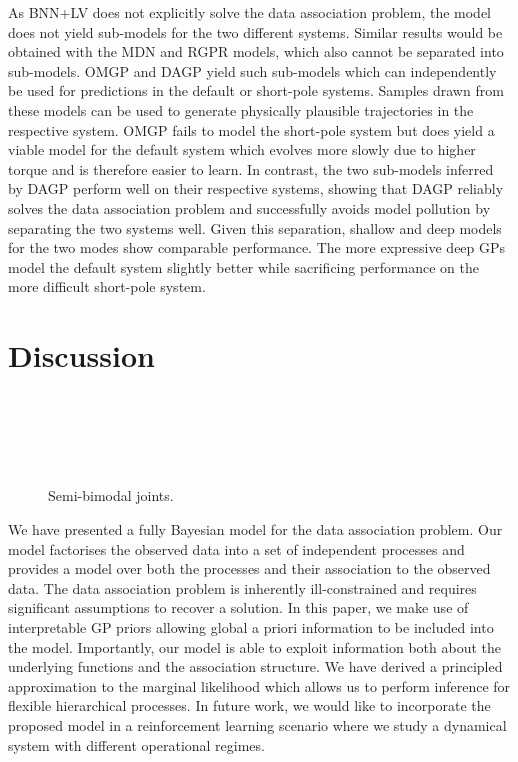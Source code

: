 As BNN+LV does not explicitly solve the data association problem, the model does not yield sub-models for the two different systems.
Similar results would be obtained with the MDN and RGPR models, which also cannot be separated into sub-models.
OMGP and DAGP yield such sub-models which can independently be used for predictions in the default or short-pole systems.
Samples drawn from these models can be used to generate physically plausible trajectories in the respective system.
OMGP fails to model the short-pole system but does yield a viable model for the default system which evolves more slowly due to higher torque and is therefore easier to learn.
In contrast, the two sub-models inferred by DAGP perform well on their respective systems, showing that DAGP reliably solves the data association problem and successfully avoids model pollution by separating the two systems well.
Given this separation, shallow and deep models for the two modes show comparable performance.
The more expressive deep GPs model the default system slightly better while sacrificing performance on the more difficult short-pole system.


\section{Discussion}
\label{toc:data_association:conclusion}
%
\begin{figure}[tp]
    \centering
    \\%
    \\%
    \\%
    \\%
    \caption{
        \label{fig:data_association:semi_bimodal_multiple}
        Semi-bimodal joints.
    }
\end{figure}
%
We have presented a fully Bayesian model for the data association problem.
Our model factorises the observed data into a set of independent processes and provides a model over both the processes and their association to the observed data.
The data association problem is inherently ill-constrained and requires significant assumptions to recover a solution.
In this paper, we make use of interpretable GP priors allowing global a priori information to be included into the model.
Importantly, our model is able to exploit information both about the underlying functions and the association structure.
We have derived a principled approximation to the marginal likelihood which allows us to perform inference for flexible hierarchical processes.
In future work, we would like to incorporate the proposed model in a reinforcement learning scenario where we study a dynamical system with different operational regimes.
